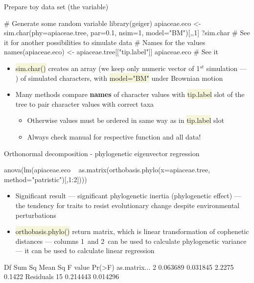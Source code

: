 \documentclass[compress, ucs, xelatex, 11pt, xcolor=svgnames, aspectratio=169,
	hyperref={
		bookmarks=true,
		unicode=true,
		colorlinks=true,
		pdftitle={Molecular data in R},
		plainpages=false,
		pdfauthor={Vojtech Zeisek},
		pdfsubject={Course about phylogeny and evolution in R},
		pdfcreator={XeLaTeX},
		pdfkeywords={R, evolution, phylogeny, molecular data},
		linkcolor=Crimson, %
		anchorcolor=Magenta, %
		citecolor=Magenta, %
		filecolor=Magenta, %
		menucolor=Magenta, %
		urlcolor=DodgerBlue, %
		pdftex},
	url={hyphens, lowtilde} %
	]{beamer}
\renewcommand{\texttt}[1]{\colorbox{Beige}{{\ttfamily #1}}}
\begin{document}
\begin{frame}[fragile]{Prepare toy data set (the variable)}
	\begin{spluscode}
    # Generate some random variable
    library(geiger)
    apiaceae.eco <- sim.char(phy=apiaceae.tree, par=0.1, nsim=1,
      model="BM")[,,1]
    ?sim.char # See it for another possibilities to simulate data
    # Names for the values
    names(apiaceae.eco) <- apiaceae.tree[["tip.label"]]
    apiaceae.eco # See it
	\end{spluscode}
	\begin{itemize}
		\item \texttt{sim.char()} creates an array (we keep only numeric vector of 1$^{st}$ simulation --- \texttt{[,,1]}) of simulated characters, with \texttt{model="BM"} under Brownian motion
		\item Many methods compare \textbf{names} of character values with \texttt{tip.label} slot of the tree to pair character values with correct taxa
		\begin{itemize}
			\item Otherwise values must be ordered in same way as in \texttt{tip.label} slot
			\item \alert{Always check manual for respective function and all data!}
		\end{itemize}
	\end{itemize}
\end{frame}

\begin{frame}[fragile]{Orthonormal decomposition - phylogenetic eigenvector regression}
	\begin{spluscode}
    anova(lm(apiaceae.eco ~ as.matrix(orthobasis.phylo(x=apiaceae.tree,
      method="patristic")[,1:2])))
	\end{spluscode}
	\begin{itemize}
		\item Significant result --- significant phylogenetic inertia (phylogenetic effect) --- the tendency for traits to resist evolutionary change despite environmental perturbations
		\item \texttt{orthobasis.phylo()} return matrix, which is linear transformation of cophenetic distances --- columns 1~and 2~can be used to calculate phylogenetic variance --- it can be used to calculate linear regression
	\end{itemize}
	\begin{spluscode}
                 Df   Sum Sq  Mean Sq F value Pr(>F)
    as.matrix...  2 0.063689 0.031845  2.2275 0.1422
    Residuals    15 0.214443 0.014296
	\end{spluscode}
\end{frame}
\end{document}
